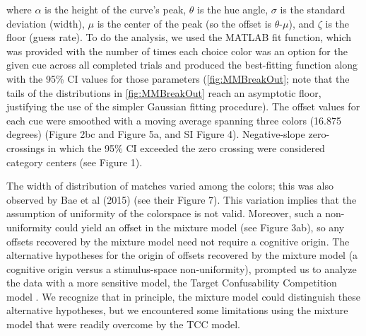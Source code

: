 

where $\alpha$ is the height of the curve’s peak, $\theta$ is the hue angle, $\sigma$ is the standard deviation (width), $\mu$ is the center of the peak (so the offset is $\theta$-$\mu$), and $\zeta$ is the floor (guess rate). 
To do the analysis, we used the MATLAB fit function, which was provided with the number of times each choice color was an option for the given cue across all completed trials and produced the best-fitting function along with the 95\% CI values for those parameters (\autoref{fig:MMBreakOut}; note that the tails of the distributions in \autoref{fig:MMBreakOut} reach an asymptotic floor, justifying the use of the simpler Gaussian fitting procedure). 
The offset values for each cue were smoothed with a moving average spanning three colors (16.875 degrees) (Figure 2bc and Figure 5a, and SI Figure 4). Negative-slope zero-crossings in which the 95\% CI exceeded the zero crossing were considered category centers (see Figure 1). %

The width of distribution of matches varied among the colors; this was also observed by Bae et al (2015) (see their Figure 7). 
This variation implies that the assumption of uniformity of the colorspace is not valid. 
Moreover, such a non-uniformity could yield an offset in the mixture model (see Figure 3ab), so any offsets recovered by the mixture model need not require a cognitive origin.  
The alternative hypotheses for the origin of offsets recovered by the mixture model (a cognitive origin versus a stimulus-space non-uniformity), prompted us to analyze the data with a more sensitive model, the Target Confusability Competition model \citep{schurgin_psychophysical_2020}.
We recognize that in principle, the mixture model could distinguish these alternative hypotheses, but we encountered some limitations using the mixture model that were readily overcome by the TCC model. 

